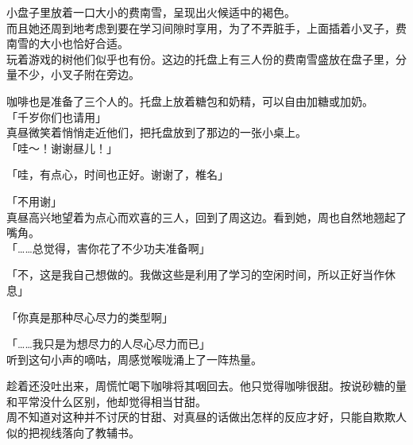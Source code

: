 小盘子里放着一口大小的费南雪，呈现出火候适中的褐色。\\

而且她还周到地考虑到要在学习间隙时享用，为了不弄脏手，上面插着小叉子，费南雪的大小也恰好合适。\\

玩着游戏的树他们似乎也有份。这边的托盘上有三人份的费南雪盛放在盘子里，分量不少，小叉子附在旁边。

咖啡也是准备了三个人的。托盘上放着糖包和奶精，可以自由加糖或加奶。\\

「千岁你们也请用」\\

真昼微笑着悄悄走近他们，把托盘放到了那边的一张小桌上。\\

「哇～！谢谢昼儿！」

「哇，有点心，时间也正好。谢谢了，椎名」

「不用谢」\\

真昼高兴地望着为点心而欢喜的三人，回到了周这边。看到她，周也自然地翘起了嘴角。\\

「……总觉得，害你花了不少功夫准备啊」

「不，这是我自己想做的。我做这些是利用了学习的空闲时间，所以正好当作休息」

「你真是那种尽心尽力的类型啊」

「……我只是为想尽力的人尽心尽力而已」\\

听到这句小声的嘀咕，周感觉喉咙涌上了一阵热量。

趁着还没吐出来，周慌忙喝下咖啡将其咽回去。他只觉得咖啡很甜。按说砂糖的量和平常没什么区别，他却觉得相当甘甜。\\

周不知道对这种并不讨厌的甘甜、对真昼的话做出怎样的反应才好，只能自欺欺人似的把视线落向了教辅书。
